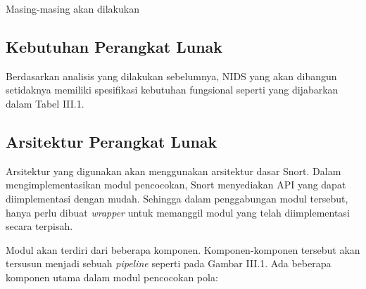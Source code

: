       Masing-masing akan dilakukan 

    \subsection{Kebutuhan Perangkat Lunak}

      Berdasarkan analisis yang dilakukan sebelumnya, NIDS yang akan dibangun setidaknya memiliki spesifikasi kebutuhan fungsional seperti yang dijabarkan dalam Tabel III.1.
      
      



    \subsection{Arsitektur Perangkat Lunak}

      Arsitektur yang digunakan akan menggunakan arsitektur dasar Snort. Dalam mengimplementasikan modul pencocokan, Snort menyediakan API yang dapat diimplementasi dengan mudah. Sehingga dalam penggabungan modul tersebut, hanya perlu dibuat \emph{wrapper} untuk memanggil modul yang telah diimplementasi secara terpisah.

      Modul akan terdiri dari beberapa komponen. Komponen-komponen tersebut akan tersusun menjadi sebuah \emph{pipeline} seperti pada Gambar III.1. Ada beberapa komponen utama dalam modul pencocokan pola:

      
      
